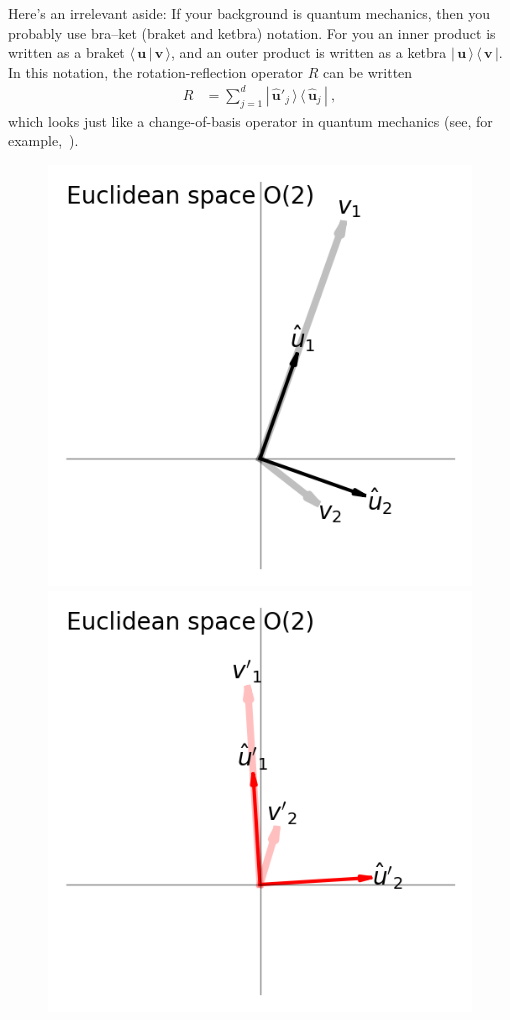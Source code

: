 \documentclass{article}
\newcommand{\Evec}[1]{{\mathbf{#1}}} %
\newcommand{\Ehat}[1]{{\mathbf{\hat{#1}}}} %
\newcommand{\braket}[2]{\langle\,{#1}\,|\,{#2}\,\rangle}
\newcommand{\ketbra}[2]{|\,{#1}\,\rangle\,\langle\,{#2}\,|}
\newlength{\figurewidth}
\begin{document}
Here's an irrelevant aside:
If your background is quantum mechanics, then you probably use bra--ket (braket and ketbra) notation.
For you an inner product is written as a braket $\braket{\Evec{u}}{\Evec{v}}$, and an outer product is written as a ketbra $\ketbra{\Evec{u}}{\Evec{v}}$.
In this notation, the rotation-reflection operator $R$ can be written 
\begin{align}
    R &= \sum_{j=1}^d \ketbra{\Ehat{u}'_j}{\Ehat{u}_j} ~,
\end{align}
which looks just like a change-of-basis operator in quantum mechanics (see, for example,~\cite{quantumtextbook}).

\begin{figure}[t]
\begin{mdframed}
\includegraphics[width=\figurewidth]{E_v.png}%
\includegraphics[width=\figurewidth]{E_vp.png}%

\end{mdframed}
\end{figure}
\end{document}
